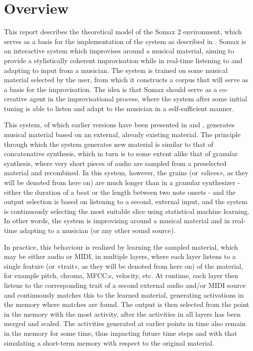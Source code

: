 \chapter{Overview}\label{sec:3-overview}
This report describes the theoretical model of the Somax 2 environment, which serves as a basis for the implementation of the system as described in \cite{somaxsoftware2021}. Somax is an interactive system which improvises around a musical material, aiming to provide a stylistically coherent improvisation while in real-time listening to and adapting to input from a musician. The system is trained on some musical material selected by the user, from which it constructs a corpus that will serve as a basis for the improvisation. The idea is that Somax should serve as a co-creative agent in the improvisational process, where the system after some initial tuning is able to listen and adapt to the musician in a self-sufficient manner.

This system, of which earlier versions have been presented in \cite{bonnasse-gahot_update_2014} and \cite{borg_2019}, generates musical material based on an external, already existing material. The principle through which the system generates new material is similar to that of concatenative synthesis, which in turn is to some extent alike that of granular synthesis, where very short pieces of audio are sampled from a preselected material and recombined. In this system, however, the grains (or «slices», as they will be denoted from here on) are much longer than in a granular synthesizer - either the duration of a beat or the length between two note onsets - and the output selection is based on listening to a second, external input, and the system is continuously selecting the most suitable slice using statistical machine learning. In other words, the system is improvising around a musical material and in real-time adapting to a musician (or any other sound source). 

In practice, this behaviour is realized by learning the sampled material, which may be either audio or MIDI, in multiple layers, where each layer listens to a single feature (or «trait», as they will be denoted from here on)  of the material, for example pitch, chroma, MFCC:s, velocity, etc. At runtime, each layer then listens to the corresponding trait of a second external audio and/or MIDI source and continuously matches this to the learned material, generating activations in the memory where matches are found. The output is then selected from the point in the memory with the most activity, after the activities in all layers has been merged and scaled. The activities generated at earlier points in time also remain in the memory for some time, thus impacting future time steps and with that simulating a short-term memory with respect to the original material.

